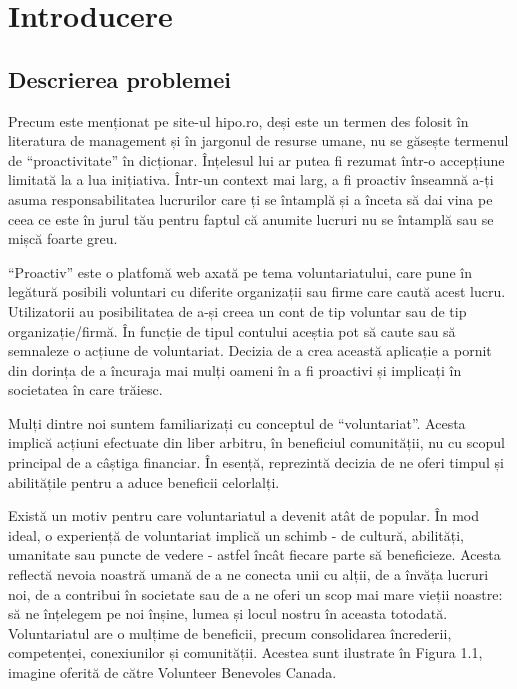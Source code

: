 \documentclass[12pt,a4paper]{report}
\begin{document}
\tableofcontents
\newpage

\chapter{Introducere}
\section{Descrierea problemei}
\par
Precum este menționat pe site-ul hipo.ro\cite{proactiv}, deși este un termen des folosit în literatura de management și în jargonul de resurse umane, nu se găsește termenul de “proactivitate” în dicționar. Înțelesul lui ar putea fi rezumat într-o accepțiune limitată la a lua inițiativa. Într-un context mai larg, a fi proactiv înseamnă a-ți asuma responsabilitatea lucrurilor care ți se întamplă și a înceta să dai vina pe ceea ce este în jurul tău pentru faptul că anumite lucruri nu se întamplă sau se mișcă foarte greu. 
\\ \par
“Proactiv” este o platfomă web axată pe tema voluntariatului, care pune în legătură posibili voluntari cu diferite organizații sau firme care caută acest lucru. Utilizatorii au posibilitatea de a-și creea un cont de tip voluntar sau de tip organizație/firmă. În funcție de tipul contului aceștia pot să caute sau să semnaleze o acțiune de voluntariat. Decizia de a crea această aplicație a pornit din dorința de a încuraja mai mulți oameni în a fi proactivi și implicați în societatea în care trăiesc. 
\\ \par
Mulți dintre noi suntem familiarizați cu conceptul de “voluntariat”. Acesta implică acțiuni efectuate din liber arbitru, în beneficiul comunității, nu cu scopul principal de a câștiga financiar. În esență, reprezintă decizia de ne oferi timpul și abilitățile pentru a aduce beneficii celorlalți.
\\ \par
Există un motiv pentru care voluntariatul a devenit atât de popular. În mod ideal, o experiență de voluntariat implică un schimb - de cultură, abilități, umanitate sau puncte de vedere - astfel încât fiecare parte să beneficieze. Acesta reflectă nevoia noastră umană de a ne conecta unii cu alții, de a învăța lucruri noi, de a contribui în societate sau de a ne oferi un scop mai mare vieții noastre: să ne înțelegem pe noi înșine, lumea și locul nostru în aceasta totodată.
\newpage
Voluntariatul are o mulțime de beneficii, precum consolidarea încrederii, competenței, conexiunilor și comunității. Acestea sunt ilustrate în Figura 1.1, imagine oferită de către Volunteer Benevoles Canada\cite{VBC}.
\end{document}
